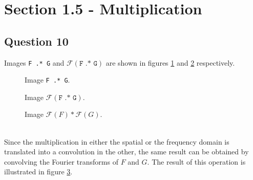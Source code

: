 \section{Section 1.5 - Multiplication}

\subsection{Question 10}

Images \texttt{F .* G} and $\mathcal{F}(\texttt{F .* G})$ are shown in figures \ref{fig:Q10_1} and \ref{fig:Q10_2} respectively.

\begin{minipage}{\linewidth}
  \centering
  \begin{minipage}{0.25\linewidth}
    \begin{figure}[H]
      \scalebox{0.4}{}
      \caption{Image \texttt{F .* G}.}
      \label{fig:Q10_1}
    \end{figure}
  \end{minipage}
  \hspace{0.05\linewidth}
  \begin{minipage}{0.25\linewidth}
    \begin{figure}[H]
      \scalebox{0.4}{}
      \caption{Image $\mathcal{F}(\texttt{F .* G})$.}
      \label{fig:Q10_2}
    \end{figure}
  \end{minipage}
    \hspace{0.05\linewidth}
  \begin{minipage}{0.25\linewidth}
    \begin{figure}[H]
      \scalebox{0.4}{}
      \caption{Image $\mathcal{F}(F) * \mathcal{F}(G)$.}
      \label{fig:Q10_3}
    \end{figure}
  \end{minipage}
\end{minipage}
\\

Since the multiplication in either the spatial or the frequency domain is translated into a convolution in the other,
the same result can be obtained by convolving the Fourier transforms of $F$ and $G$. The result of this operation is
illustrated in figure \ref{fig:Q10_3}.

